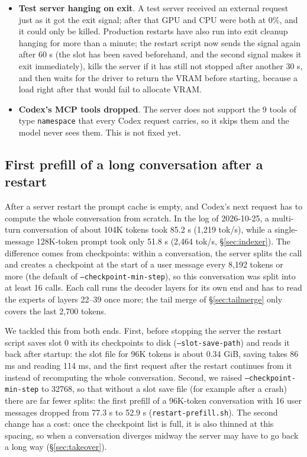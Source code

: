 \documentclass[11pt,a4paper]{article}
\newcommand{\code}[1]{\texttt{#1}}
\newcommand{\tps}{tok/s}
\begin{document}
\begin{itemize}
  \item \textbf{Test server hanging on exit}. A test server received an external request just as it got the exit signal; after that GPU and CPU were both at 0\%, and it could only be killed. Production restarts have also run into exit cleanup hanging for more than a minute; the restart script now sends the signal again after 60 s (the slot has been saved beforehand, and the second signal makes it exit immediately), kills the server if it has still not stopped after another 30 s, and then waits for the driver to return the VRAM before starting, because a load right after that would fail to allocate VRAM.
  \item \textbf{Codex's MCP tools dropped}. The server does not support the 9 tools of type \code{namespace} that every Codex request carries, so it skips them and the model never sees them. This is not fixed yet.
\end{itemize}

\subsection{First prefill of a long conversation after a restart}
\label{sec:restart}

After a server restart the prompt cache is empty, and Codex's next request has to compute the whole conversation from scratch. In the log of 2026-10-25, a multi-turn conversation of about 104K tokens took 85.2 s (1,219 \tps{}), while a single-message 128K-token prompt took only 51.8 s (2,464 \tps{}, \S\ref{sec:indexer}). The difference comes from checkpoints: within a conversation, the server splits the call and creates a checkpoint at the start of a user message every 8,192 tokens or more (the default of \code{--checkpoint-min-step}), so this conversation was split into at least 16 calls. Each call runs the decoder layers for its own end and has to read the experts of layers 22--39 once more; the tail merge of \S\ref{sec:tailmerge} only covers the last 2,700 tokens.

We tackled this from both ends. First, before stopping the server the restart script saves slot 0 with its checkpoints to disk (\code{--slot-save-path}) and reads it back after startup: the slot file for 96K tokens is about 0.34 GiB, saving takes 86 ms and reading 114 ms, and the first request after the restart continues from it instead of recomputing the whole conversation. Second, we raised \code{--checkpoint-min-step} to 32768, so that without a slot save file (for example after a crash) there are far fewer splits: the first prefill of a 96K-token conversation with 16 user messages dropped from 77.3 s to 52.9 s (\code{restart-prefill.sh}). The second change has a cost: once the checkpoint list is full, it is also thinned at this spacing, so when a conversation diverges midway the server may have to go back a long way (\S\ref{sec:takeover}).
\end{document}
